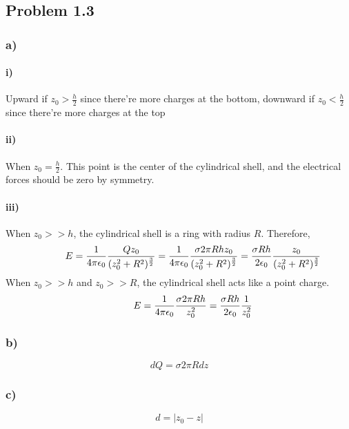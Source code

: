 \documentclass[../homework.tex]{subfiles}
\begin{document}
\subsection{Problem 1.3}
\subsubsection*{a)}
\setlength{\leftskip}{1cm}
\paragraph*{i)}
Upward if $z_0 > \frac{h}{2}$ since there're more charges at the bottom, downward if $z_0 < \frac{h}{2}$ since there're more charges at the top
\paragraph*{ii)}
When $z_0 = \frac{h}{2}$. This point is the center of the cylindrical shell, and the electrical forces should be zero by symmetry.
\paragraph*{iii)}
When $z_0 >>h$, the cylindrical shell is a ring with radius $R$. Therefore,
\begin{equation*}
    \hspace*{1cm} E = \frac{1}{4\pi \epsilon_0} \frac{Qz_0}{(z_0^2 + R^2)^\frac{3}{2}} = \frac{1}{4\pi \epsilon_0} \frac{\sigma 2 \pi R h z_0}{(z_0^2 + R^2)^\frac{3}{2}} = \frac{\sigma R h}{2 \epsilon_0} \frac{z_0}{(z_0^2 + R^2)^\frac{3}{2}}
\end{equation*}
\indent When $z_0 >> h$ and $z_0 >> R$, the cylindrical shell acts like a point charge.
\begin{equation*}
    \hspace*{1cm} E = \frac{1}{4\pi \epsilon_0} \frac{\sigma 2\pi R h}{z_0^2} = \frac{\sigma R h}{2 \epsilon_0} \frac{1}{z_0^2}
\end{equation*}
\setlength{\leftskip}{0cm}
\subsubsection*{b)}
\begin{equation*}
    dQ = \sigma 2\pi R dz
\end{equation*}
\subsubsection*{c)}
\begin{equation*}
    d = |{z_0 - z}|
\end{equation*}
\end{document}
